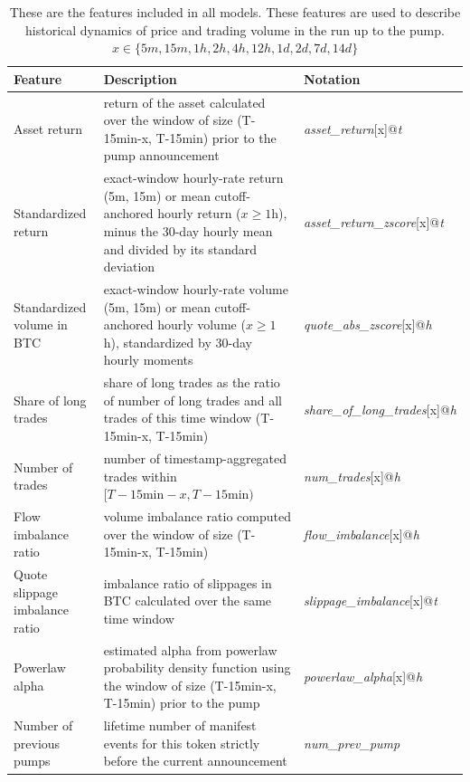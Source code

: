\documentclass{ieeeaccess}
\begin{document}
\begin{table}[!t]
    \centering
    \small
    \renewcommand{\arraystretch}{1.25}
    \setlength{\tabcolsep}{10pt}
    \begin{tabular}{p{3cm}p{7cm}l}
        \hline
        \textbf{Feature} & \textbf{Description} & \textbf{Notation} \\
        \hline
        Asset return & return of the asset calculated over the window of size (T-15min-x, T-15min) prior to the pump announcement& \textit{asset\_return}[x]@\textit{t} \\
        \hline
        Standardized return & exact-window hourly-rate return (5m, 15m) or mean cutoff-anchored hourly return ($x\geq1$h), minus the 30-day hourly mean and divided by its standard deviation & \textit{asset\_return\_zscore}[x]@\textit{t} \\
        \hline
        Standardized volume in BTC & exact-window hourly-rate volume (5m, 15m) or mean cutoff-anchored hourly volume ($x\geq1$h), standardized by 30-day hourly moments & \textit{quote\_abs\_zscore}[x]@\textit{h} \\
        \hline
        Share of long trades & share of long trades as the ratio of number of long trades and all trades of this time window (T-15min-x, T-15min) & \textit{share\_of\_long\_trades}[x]@\textit{h} \\
        \hline
        Number of trades & number of timestamp-aggregated trades within $[T-15\mathrm{min}-x,T-15\mathrm{min})$ & \textit{num\_trades}[x]@\textit{h} \\
        \hline
        Flow imbalance ratio & volume imbalance ratio computed over the window of size (T-15min-x, T-15min) & \textit{flow\_imbalance}[x]@\textit{h} \\
        \hline
        Quote slippage imbalance ratio & imbalance ratio of slippages in BTC calculated over the same time window & \textit{slippage\_imbalance}[x]@\textit{t} \\
        \hline
        Powerlaw alpha & estimated alpha from powerlaw probability density function using the window of size (T-15min-x, T-15min) prior to the pump & \textit{powerlaw\_alpha}[x]@\textit{h} \\
        \hline
        Number of previous pumps & lifetime number of manifest events for this token strictly before the current announcement & \textit{num\_prev\_pump} \\
        \hline
    \end{tabular}
    \caption{These are the features included in all models. These features are used to describe historical dynamics of price and trading volume in the run up to the pump. $x \in \{5m, 15m, 1h, 2h, 4h, 12h, 1d, 2d, 7d, 14d\}$}
    \label{table:feature_descriptions}
\end{table}
\end{document}
